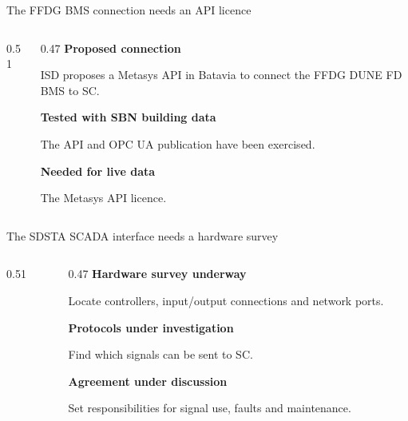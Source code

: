 \documentclass[aspectratio=169,11pt]{beamer}
\begin{document}
\begin{frame}{The FFDG BMS connection needs an API licence}
\begin{columns}[T,onlytextwidth]
\begin{column}{0.51\textwidth}
\centering\siteboundarymap
\end{column}
\begin{column}{0.47\textwidth}
\textbf{Proposed connection}\par
ISD proposes a Metasys API in Batavia to connect the FFDG DUNE FD BMS to SC.\par\bigskip
\textbf{Tested with SBN building data}\par
The API and OPC UA publication have been exercised.\par\bigskip
\textbf{Needed for live data}\par
The Metasys API licence.
\end{column}
\end{columns}\par\bigskip
\raggedright{}
\end{frame}

\DpsFfdgUpdate

\begin{frame}{The SDSTA SCADA interface needs a hardware survey}
\begin{columns}[T,onlytextwidth]
\begin{column}{0.51\textwidth}
\centering\siteboundarymap
\end{column}
\begin{column}{0.47\textwidth}
\textbf{Hardware survey underway}\par
Locate controllers, input/output connections and network ports.\par\bigskip
\textbf{Protocols under investigation}\par
Find which signals can be sent to SC.\par\bigskip
\textbf{Agreement under discussion}\par
Set responsibilities for signal use, faults and maintenance.
\end{column}
\end{columns}\par\bigskip
\raggedright{}
\end{frame}
\end{document}

